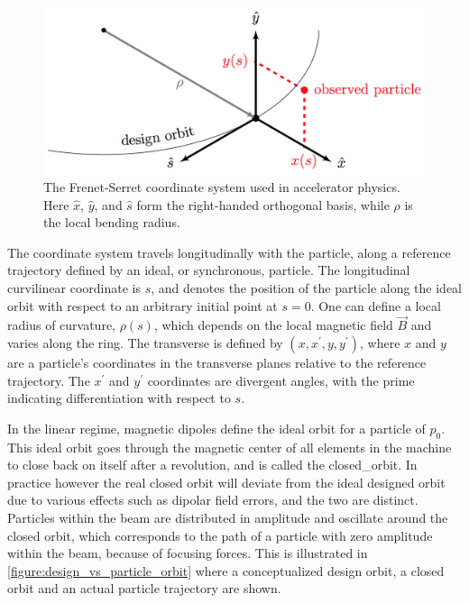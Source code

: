 \begin{figure}[!htb]
    \centering
    \includegraphics[width=0.9\linewidth]{Figures/Beam_Dynamics_Theory/Frenet_Serret_Coordinate_System.png}
    \caption{The Frenet-Serret coordinate system used in accelerator physics. Here \(\hat{x}\), \(\hat{y}\), and \(\hat{s}\) form the right-handed orthogonal basis, while \(\rho\) is the local bending radius.}
    \label{figure:frenet_serret_system}
\end{figure}

The coordinate system travels longitudinally with the particle, along a reference trajectory defined by an ideal, or \gls{synchronous}, particle.
The longitudinal curvilinear coordinate is \(s\), and denotes the position of the particle along the ideal orbit with respect to an arbitrary initial point at \(s = 0\).
One can define a local radius of curvature, \(\rho(s)\), which depends on the local magnetic field \(\vec{B}\) and varies along the ring.
The transverse  is defined by \((x, x^{\prime}, y, y^{\prime})\), where \(x\) and \(y\) are a particle's coordinates in the transverse planes relative to the reference trajectory.
The \(x^{\prime}\) and \(y^{\prime}\) coordinates are divergent angles, with the prime indicating differentiation with respect to \(s\).

In the linear regime, magnetic dipoles define the ideal orbit for a particle of  \(p_0\).
This ideal orbit goes through the magnetic center of all elements in the machine to close back on itself after a revolution, and is called the \gls{closed_orbit}.
In practice however the real closed orbit will deviate from the ideal designed orbit due to various effects such as dipolar field errors, and the two are distinct.
Particles within the beam are distributed in amplitude and oscillate around the closed orbit, which corresponds to the path of a particle with zero amplitude within the beam, because of focusing forces. 
This is illustrated in \cref{figure:design_vs_particle_orbit} where a conceptualized design orbit, a closed orbit and an actual particle trajectory are shown.


